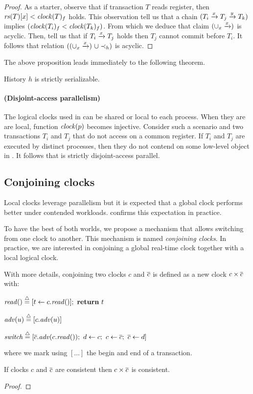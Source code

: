 \begin{proof}
  As a starter, observe that if transaction $T$ reads register, then $\readSetOf{T}[x] < \clockOf{T}_f$ holds.
  This observation tell us that a chain $(T_i \stmPrec{x} T_j \stmPrec{y} T_k)$ implies $(\clockOf{T_i}_f < \clockOf{T_k}_f)$.
  From which we deduce that claim $(\union_{x} \stmPrec{x})$ is acyclic.
  Then,  tell us that if $T_i \stmPrec{x} T_j$ holds then $T_j$ cannot commit before $T_i$.
  It follows that relation $((\union_{x} \stmPrec{x}) ~\union \hb_h)$ is acyclic.  
\end{proof}

The above proposition leads immediately to the following theorem.

\begin{theorem}
  History $h$ is strictly serializable.
\end{theorem}

\paragraph{(Disjoint-access parallelism)}
The logical clocks used in  can be shared or local to each process.
When they are are local, function $\clockOf{p}$ becomes injective.
Consider such a scenario and two transactions $T_i$ and $T_j$ that do not access on a common register.
If $T_i$ and $T_j$ are executed by distinct processes, then they do not contend on some low-level object in .
It follows that  is strictly disjoint-access parallel.

\subsection{Conjoining clocks}

Local clocks leverage parallelism but it is expected that a global clock performs better under contended workloads.
 confirms this expectation in practice.

To have the best of both worlds, we propose a mechanism that allows switching from one clock to another.
This mechanism is named \emph{conjoining clocks}.
In practice, we are interested in conjoining a global real-time clock together with a local logical clock.

With more details, conjoining two clocks $c$ and $\barc$ is defined as a new clock $c \times \barc$ with:
\begin{compactitem}
\item $\cread \equaldef [t \assign c.\cread];~\text{\textbf{return}}~t$
\item $\cadv(u) \equaldef [c.\cadv(u)]$
\item $\cswitch \equaldef [\barc.\cadv(c.\cread);~d \assign c;~c \assign \barc;~\barc \assign d]$
\end{compactitem}
where we mark using $[ \ldots ]$ the begin and end of a transaction.

\begin{proposition}
  If clocks $c$ and $\barc$ are consistent then $c \times \barc$ is consistent.
\end{proposition}

\begin{proof}
  
\end{proof}

 
